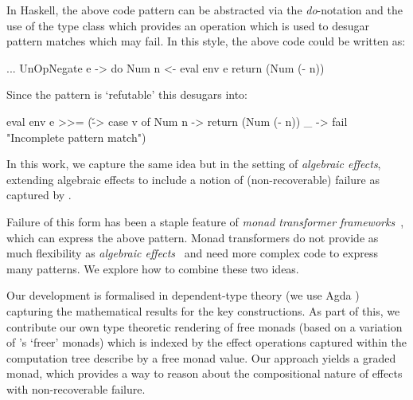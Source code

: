 \documentclass[preprint,sigplan]{acmart}
\newcommand{\dnote}[1]{\textcolor{purple}{Dom: #1}}
\begin{document}
In Haskell, the above code pattern can be abstracted via
the \emph{do}-notation and the use of
the  type class which provides an operation
 which is used to desugar pattern matches which may
fail. In this style, the above code could be written as:
%
\begin{haskell}
... UnOpNegate e -> do
         Num n <- eval env e
         return (Num (- n))
\end{haskell}
%
Since the  pattern is `refutable' this
desugars into:
%
\begin{haskell}
  eval env e >>= (\v -> case v of
      Num n -> return (Num (- n))
      _     -> fail "Incomplete pattern match")
\end{haskell}
%
In this work, we capture the same idea but in the
setting of \emph{algebraic effects}, extending algebraic
effects to include a notion of (non-recoverable) failure
as captured by .

Failure of this form has been a staple feature of \emph{monad transformer frameworks}~\cite{transformerpub}, which can express the above pattern.
Monad transformers do not provide as much flexibility as \emph{algebraic effects}~\cite{freerm}
and need more complex code to express many patterns.
We explore how to combine these two ideas.

Our development is formalised in dependent-type theory
(we use Agda \cite{repo}) capturing
the mathematical results for the key
constructions. As part of this, we contribute our own
type theoretic rendering of free monads (based on a variation of
\citet{freerm}'s `freer' monads) which is indexed by the effect
operations captured within the computation tree describe by a free
monad value. Our approach yields
a graded monad, which provides a way to reason about the compositional
nature of effects with non-recoverable failure.


\end{document}
